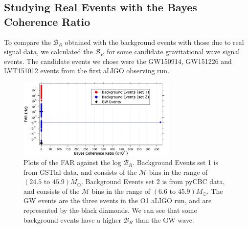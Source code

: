 \documentclass{article}
\begin{document}
 
 
 \subsection{Studying Real Events with the Bayes Coherence Ratio}
 
 
 
 To compare the $\mathcal{B}_{R}$ obtained with the background events with those due to real signal data, we calculated the $\mathcal{B}_{R}$ for some candidate gravitational wave signal events. The candidate events we chose were the GW150914, GW151226 and LVT151012 events from the first aLIGO observing run.
 
 
 
 
 
 \begin{figure}[h]
 	\centering
 	\includegraphics[width=0.7\textwidth]{Figures/Outlier.png} 
 	\caption{Plots of the FAR against the log $\mathcal{B}_{R}$. Background Events set 1 is from GSTlal data, and consists of the $\mathcal{M}$ bins in the range of $(24.5  \text{ to } 45.9) M_{\odot}$. Background Events set 2 is from pyCBC data, and consists of the $\mathcal{M}$ bins in the range of $(6.6  \text{ to } 45.9) M_{\odot}$. The GW events are the three events in the O1 aLIGO run, and are represented by the black diamonds. We can see that some background events have a higher $\mathcal{B}_{R}$ than the GW wave. }
 	\label{Fig:outlier}
 \end{figure}
 
\end{document}
